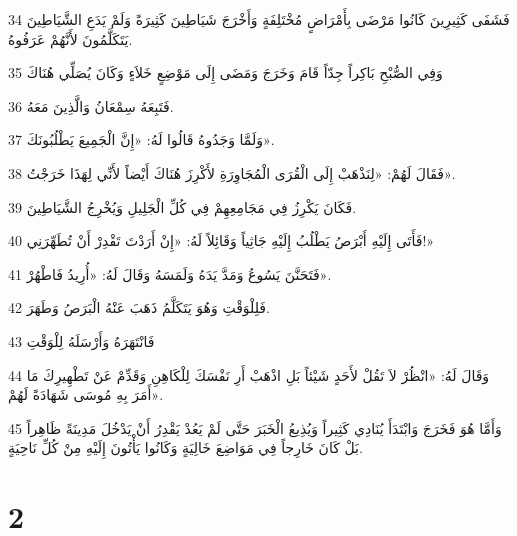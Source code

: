 \par 34 فَشَفَى كَثِيرِينَ كَانُوا مَرْضَى بِأَمْرَاضٍ مُخْتَلِفَةٍ وَأَخْرَجَ شَيَاطِينَ كَثِيرَةً وَلَمْ يَدَعِ الشَّيَاطِينَ يَتَكَلَّمُونَ لأَنَّهُمْ عَرَفُوهُ.
\par 35 وَفِي الصُّبْحِ بَاكِراً جِدّاً قَامَ وَخَرَجَ وَمَضَى إِلَى مَوْضِعٍ خَلاَءٍ وَكَانَ يُصَلِّي هُنَاكَ
\par 36 فَتَبِعَهُ سِمْعَانُ وَالَّذِينَ مَعَهُ.
\par 37 وَلَمَّا وَجَدُوهُ قَالُوا لَهُ: «إِنَّ الْجَمِيعَ يَطْلُبُونَكَ».
\par 38 فَقَالَ لَهُمْ: «لِنَذْهَبْ إِلَى الْقُرَى الْمُجَاوِرَةِ لأَكْرِزَ هُنَاكَ أَيْضاً لأَنِّي لِهَذَا خَرَجْتُ».
\par 39 فَكَانَ يَكْرِزُ فِي مَجَامِعِهِمْ فِي كُلِّ الْجَلِيلِ وَيُخْرِجُ الشَّيَاطِينَ.
\par 40 فَأَتَى إِلَيْهِ أَبْرَصُ يَطْلُبُ إِلَيْهِ جَاثِياً وَقَائِلاً لَهُ: «إِنْ أَرَدْتَ تَقْدِرْ أَنْ تُطَهِّرَنِي!»
\par 41 فَتَحَنَّنَ يَسُوعُ وَمَدَّ يَدَهُ وَلَمَسَهُ وَقَالَ لَهُ: «أُرِيدُ فَاطْهُرْ».
\par 42 فَلِلْوَقْتِ وَهُوَ يَتَكَلَّمُ ذَهَبَ عَنْهُ الْبَرَصُ وَطَهَرَ.
\par 43 فَانْتَهَرَهُ وَأَرْسَلَهُ لِلْوَقْتِ
\par 44 وَقَالَ لَهُ: «انْظُرْ لاَ تَقُلْ لأَحَدٍ شَيْئاً بَلِ اذْهَبْ أَرِ نَفْسَكَ لِلْكَاهِنِ وَقَدِّمْ عَنْ تَطْهِيرِكَ مَا أَمَرَ بِهِ مُوسَى شَهَادَةً لَهُمْ».
\par 45 وَأَمَّا هُوَ فَخَرَجَ وَابْتَدَأَ يُنَادِي كَثِيراً وَيُذِيعُ الْخَبَرَ حَتَّى لَمْ يَعُدْ يَقْدِرُ أَنْ يَدْخُلَ مَدِينَةً ظَاهِراً بَلْ كَانَ خَارِجاً فِي مَوَاضِعَ خَالِيَةٍ وَكَانُوا يَأْتُونَ إِلَيْهِ مِنْ كُلِّ نَاحِيَةٍ.

\chapter{2}

